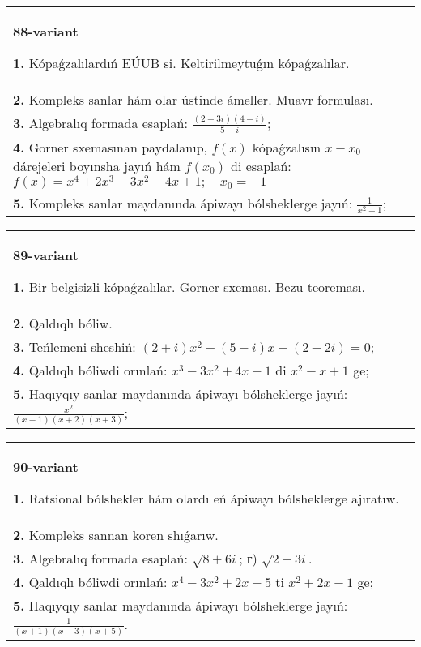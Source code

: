 \documentclass{article}
\begin{document}
\begin{tabular}{m{17cm}}
\textbf{88-variant}
\newline

\textbf{1.} Kópaǵzalılardıń EÚUB si. Keltirilmeytuǵın   kópaǵzalılar. \\
\textbf{2.} Kompleks sanlar hám olar ústinde ámeller. Muavr formulası.  \\
\textbf{3.} Algebralıq formada esaplań: $\frac{(2-3 i)(4-i)}{5-i}$; \\
\textbf{4.} Gorner sxemasınan paydalanıp, $f(x)$ kópaǵzalısın $x-x_0$ dárejeleri boyınsha jayıń hám $f\left(x_0\right)$ di esaplań: $f(x)=x^4+2 x^3-3 x^2-4 x+1 ; \quad x_0=-1$ \\
\textbf{5.} Kompleks sanlar maydanında ápiwayı bólsheklerge jayıń: $\frac{1}{x^2-1}$; \\

\end{tabular}
\vspace{1cm}


\begin{tabular}{m{17cm}}
\textbf{89-variant}
\newline

\textbf{1.} Bir belgisizli kópaǵzalılar. Gorner sxeması. Bezu teoreması.  \\
\textbf{2.} Qaldıqlı bóliw.  \\
\textbf{3.} Teńlemeni sheshiń:  $(2+i) x^2-(5-i) x+(2-2 i)=0$; \\
\textbf{4.} Qaldıqlı bóliwdi orınlań:  $x^3-3 x^2+4 x-1$ di $x^2-x+1$ ge; \\
\textbf{5.} Haqıyqıy sanlar maydanında ápiwayı bólsheklerge jayıń:  $\frac{x^2}{(x-1)(x+2)(x+3)}$; \\

\end{tabular}
\vspace{1cm}


\begin{tabular}{m{17cm}}
\textbf{90-variant}
\newline

\textbf{1.} Ratsional bólshekler hám olardı eń ápiwayı bólsheklerge ajıratıw. \\
\textbf{2.} Kompleks sannan koren shıǵarıw. \\
\textbf{3.} Algebralıq formada esaplań: $\sqrt{8+6 i}$; г) $\sqrt{2-3 i}$. \\
\textbf{4.} Qaldıqlı bóliwdi orınlań: $x^4-3 x^2+2 x-5$ ti $x^2+2 x-1$ ge; \\
\textbf{5.} Haqıyqıy sanlar maydanında ápiwayı bólsheklerge jayıń:  $\frac{1}{(x+1)(x-3)(x+5)}$. \\

\end{tabular}
\vspace{1cm}
\end{document}
